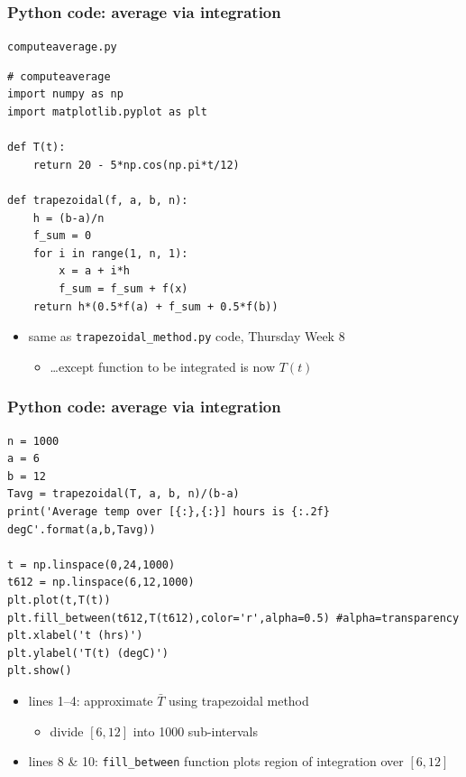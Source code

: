 \documentclass[english,14pt]{beamer}
\begin{document}

\begin{frame}[fragile]

\frametitle{Python code: average via integration}

\texttt{computeaverage.py}
\begin{lstlisting}[style=CStyle,basicstyle=\scriptsize]
# computeaverage
import numpy as np
import matplotlib.pyplot as plt

def T(t):
    return 20 - 5*np.cos(np.pi*t/12)

def trapezoidal(f, a, b, n):
    h = (b-a)/n
    f_sum = 0
    for i in range(1, n, 1):
        x = a + i*h
        f_sum = f_sum + f(x)
    return h*(0.5*f(a) + f_sum + 0.5*f(b))
\end{lstlisting}

\begin{itemize}
	\item same as \texttt{trapezoidal\_method.py} code, Thursday Week 8
	\begin{itemize}
		\item[] \ldots except function to be integrated is now $T(t)$
	\end{itemize}
\end{itemize}

\end{frame}


\begin{frame}[fragile]

\frametitle{Python code: average via integration}
\vspace*{-2mm}
\begin{lstlisting}[style=CStyle,basicstyle=\scriptsize]
n = 1000
a = 6
b = 12
Tavg = trapezoidal(T, a, b, n)/(b-a)
print('Average temp over [{:},{:}] hours is {:.2f} degC'.format(a,b,Tavg))

t = np.linspace(0,24,1000)
t612 = np.linspace(6,12,1000)
plt.plot(t,T(t))
plt.fill_between(t612,T(t612),color='r',alpha=0.5) #alpha=transparency
plt.xlabel('t (hrs)')
plt.ylabel('T(t) (degC)')
plt.show()
\end{lstlisting}

\begin{itemize}
	\item lines 1--4: approximate $\bar{T}$ using trapezoidal method
	\begin{itemize}
		\item divide $[6,12]$ into 1000 sub-intervals
	\end{itemize}
	\item lines 8 \& 10: \texttt{fill\_between} function plots region of integration over $[6,12]$ 
\end{itemize}

\end{frame}
\end{document}
